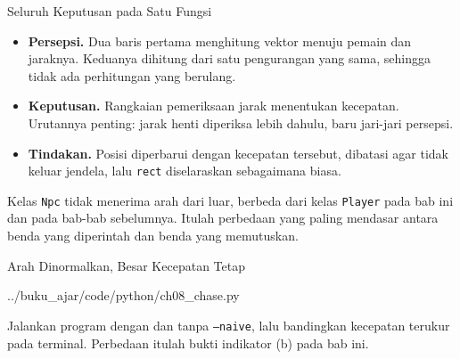 \documentclass[aspectratio=169,10pt]{beamer}
\begin{document}
\begin{frame}{Seluruh Keputusan pada Satu Fungsi}
\begin{itemize}
  \item \textbf{Persepsi.} Dua baris pertama menghitung vektor menuju pemain
        dan jaraknya. Keduanya dihitung dari satu pengurangan yang sama,
        sehingga tidak ada perhitungan yang berulang.
  \item \textbf{Keputusan.} Rangkaian pemeriksaan jarak menentukan kecepatan.
        Urutannya penting: jarak henti diperiksa lebih dahulu, baru jari-jari
        persepsi.
  \item \textbf{Tindakan.} Posisi diperbarui dengan kecepatan tersebut,
        dibatasi agar tidak keluar jendela, lalu \texttt{rect} diselaraskan
        sebagaimana biasa.
\end{itemize}
\vspace{0.16cm}
\begin{kotak}
Kelas \texttt{Npc} tidak menerima arah dari luar, berbeda dari kelas
\texttt{Player} pada bab ini dan pada bab-bab sebelumnya. Itulah perbedaan yang
paling mendasar antara benda yang diperintah dan benda yang memutuskan.
\end{kotak}
\end{frame}

\begin{frame}[fragile]{Arah Dinormalkan, Besar Kecepatan Tetap}

  {../buku_ajar/code/python/ch08_chase.py}
\vspace{0.12cm}
\begin{kotak}
Jalankan program dengan dan tanpa \texttt{--naive}, lalu bandingkan kecepatan
terukur pada terminal. Perbedaan itulah bukti indikator (b) pada bab ini.
\end{kotak}
\end{frame}
\end{document}

